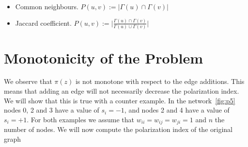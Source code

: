  \begin{itemize}
  \item Common neighbours. $P(u,v):= \lvert\Gamma(u) \cap \Gamma(v)\rvert$
  
  
  
  \item Jaccard coefficient. $P(u,v):= \lvert\frac{\Gamma(u) \cap \Gamma(v)}{\Gamma(u) \cup \Gamma(v)}\rvert$
\end{itemize}


\section{Monotonicity of the Problem}
\label{sec:monotonicity}
\vspace{20pt}
We observe that $\pi(z)$ is not monotone with respect to the edge additions. This means that adding an edge will not necessarily decrease the polarization index. We will  show that this is true with a counter example. In the network~\ref{fig:p5} nodes 0, 2 and 3 have a value of $s_i=-1$, and nodes 2 and 4 have a value of $s_i=+1$. For both examples we assume that $w_{ii}=w_{ij}=w_{ji}=1$ and $n$ the number of nodes.
We will now compute the polarization index of the original graph
\\
\\
